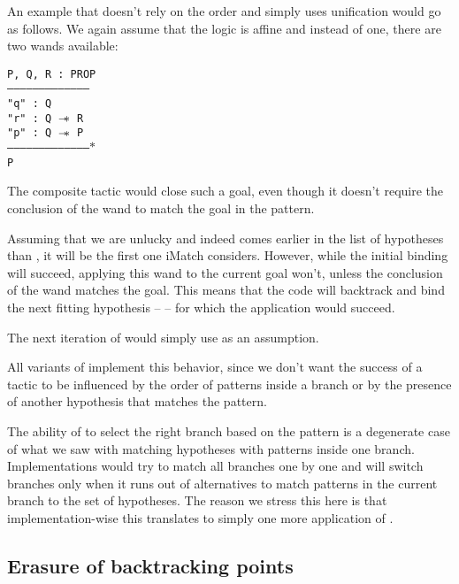 An example that doesn't rely on the order and simply uses unification would go as follows.
We again assume that the logic is affine and instead of one, there are two wands available:

\begin{minipage}{\linewidth}
\texttt{P, Q, R : PROP\\
---------------------------------------\\
"q" : Q\\
"r" : Q $\mathrel{-\mkern-6mu*}$ R\\
"p" : Q $\mathrel{-\mkern-6mu*}$ P\\
--------------------------------------$\ast$\\
P
}
\end{minipage}

The composite tactic  would close such a goal, even though it doesn't require the conclusion of the wand to match the goal in the pattern.

Assuming that we are unlucky and  indeed comes earlier in the list of hypotheses than , it will be the first one iMatch considers.
However, while the initial binding will succeed, applying this wand to the current goal won't, unless the conclusion of the wand matches the goal.
This means that the code will backtrack and bind the next fitting hypothesis --  -- for which the application would succeed.

The next iteration of  would simply use  as an assumption.

All variants of  implement this behavior, since we don't want the success of a tactic to be influenced by the order of patterns inside a branch or by the presence of another hypothesis that matches the pattern.

The ability of  to select the right branch based on the pattern is a degenerate case of what we saw with matching hypotheses with patterns inside one branch.
Implementations would try to match all branches one by one and will switch branches only when it runs out of alternatives to match patterns in the current branch to the set of hypotheses.
The reason we stress this here is that implementation-wise this translates to simply one more application of .

\subsection{Erasure of backtracking points}

